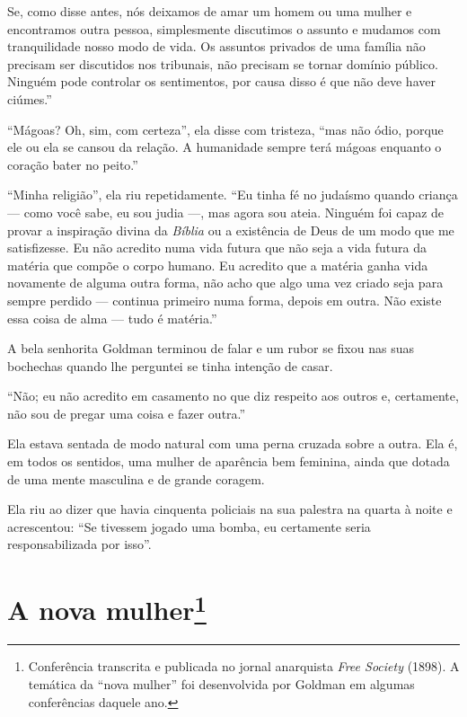 Se, como disse antes, nós deixamos de amar um homem ou uma
mulher e encontramos outra pessoa, simplesmente discutimos o assunto e mudamos
com tranquilidade nosso modo de vida. Os assuntos privados de uma família
não precisam ser discutidos nos tribunais, não precisam se tornar
domínio público. Ninguém pode controlar os sentimentos, por causa disso
é que não deve haver ciúmes.''

``Mágoas? Oh, sim, com certeza'', ela disse com tristeza, ``mas não
ódio, porque ele ou ela se cansou da relação. A humanidade sempre terá
mágoas enquanto o coração bater no peito.''

``Minha religião'', ela riu repetidamente. ``Eu tinha fé no judaísmo
quando criança --- como você sabe, eu sou judia ---, mas agora sou ateia.
Ninguém foi capaz de provar a inspiração divina da \emph{Bíblia} ou a
existência de Deus de um modo que me satisfizesse. Eu não acredito numa
vida futura que não seja a vida futura da matéria que compõe o corpo
humano. Eu acredito que a matéria ganha vida novamente de alguma outra
forma, não acho que algo uma vez criado seja para sempre perdido --- continua primeiro numa forma, depois em outra. Não existe essa
coisa de alma --- tudo é matéria.''

A bela senhorita Goldman terminou de falar e um rubor se fixou nas suas
bochechas quando lhe perguntei se tinha intenção de casar.

``Não; eu não acredito em casamento no que diz respeito aos outros e,
certamente, não sou de pregar uma coisa e fazer outra.''

Ela estava sentada de modo natural com uma perna cruzada sobre a outra.
Ela é, em todos os sentidos, uma mulher de aparência bem feminina, ainda
que dotada de uma mente masculina e de grande coragem.

Ela riu ao dizer que havia cinquenta policiais na sua palestra na quarta
à noite e acrescentou: ``Se tivessem jogado uma bomba, eu certamente
seria responsabilizada por isso''.

\chapter{A nova mulher\footnote[*]{Conferência transcrita e publicada no jornal
  anarquista \emph{Free Society} (1898). A temática da ``nova mulher'' foi
  desenvolvida por Goldman em algumas conferências daquele ano.}}

